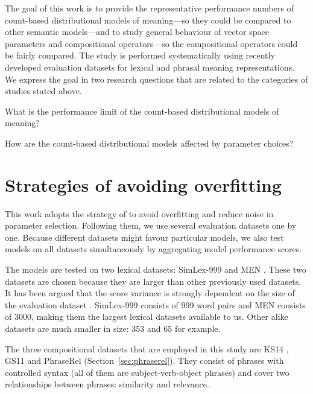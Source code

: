 The goal of this work is to provide the representative performance numbers of count-based distributional models of meaning---so they could be compared to other semantic models---and to study general behaviour of vector space parameters and compositional operators---so the compositional operators could be fairly compared. The study is performed systematically using recently developed evaluation datasets for lexical and phrasal meaning representations. We express the goal in two research questions that are related to the categories of studies stated above.
\begin{compactitem}
\item What is the performance limit of the count-based distributional models of meaning?
\item How are the count-based distributional models affected by parameter choices?
\end{compactitem}

\section{Strategies of avoiding overfitting}
\label{sec:avoiding-overfitting}

This work adopts the strategy of  to avoid overfitting and reduce noise in parameter selection. Following them, we use several evaluation datasets one by one. Because different datasets might favour particular models, we also test models on all datasets simultaneously by aggregating model performance scores.

The models are tested on two lexical datasets: SimLex-999 \cite{hill2014simlex} and MEN \cite{Bruni:2014:MDS:2655713.2655714}. These two datasets are chosen because they are larger than other previously used datasets. It has been argued that the score variance is strongly dependent on the size of the evaluation dataset \cite{W16-2502}. SimLex-999 consists of 999 word pairs and MEN consists of 3000, making them the largest lexical datasets available to us. Other alike datasets are much smaller in size: 353 \cite{2002:PSC:503104.503110} and 65 \cite{Rubenstein:1965:CCS:365628.365657} for example.

The three compositional datasets that are employed in this study are KS14 \cite{kartsadrqpl2014}, GS11 \cite{Grefenstette:2011:ESC:2145432.2145580} and PhraseRel (Section~\ref{sec:phraserel}). They consist of phrases with controlled syntax (all of them are subject-verb-object phrases) and cover two relationships between phrases: similarity and relevance.

